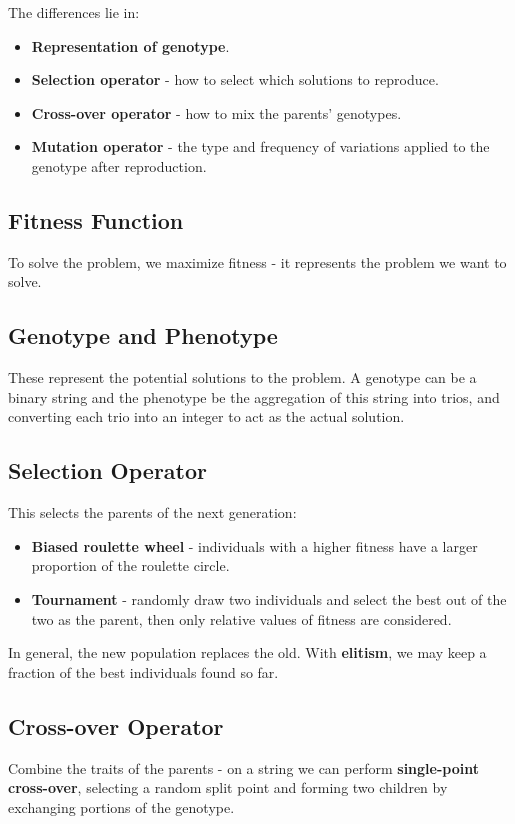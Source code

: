 \documentclass[11pt]{article}
\begin{document}
The differences lie in:
\begin{itemize}
  \item \textbf{Representation of genotype}.
  \item \textbf{Selection operator} - how to select which solutions to reproduce.
  \item \textbf{Cross-over operator} - how to mix the parents' genotypes.
  \item \textbf{Mutation operator} - the type and frequency of variations applied to the genotype after reproduction.
\end{itemize}

\subsection{Fitness Function}
To solve the problem, we maximize fitness - it represents the problem we want to solve.

\subsection{Genotype and Phenotype}
These represent the potential solutions to the problem.
A genotype can be a binary string and the phenotype be the aggregation of this string into trios, and converting each trio into an integer to act as the actual solution.

\subsection{Selection Operator}
This selects the parents of the next generation:
\begin{itemize}
  \item \textbf{Biased roulette wheel} - individuals with a higher fitness have a larger proportion of the roulette circle.
  \item \textbf{Tournament} - randomly draw two individuals and select the best out of the two as the parent, then only relative values of fitness are considered.
\end{itemize}

In general, the new population replaces the old.
With \textbf{elitism}, we may keep a fraction of the best individuals found so far.

\subsection{Cross-over Operator}
Combine the traits of the parents - on a string we can perform \textbf{single-point cross-over}, selecting a random split point and forming two children by exchanging portions of the genotype.
\end{document}
